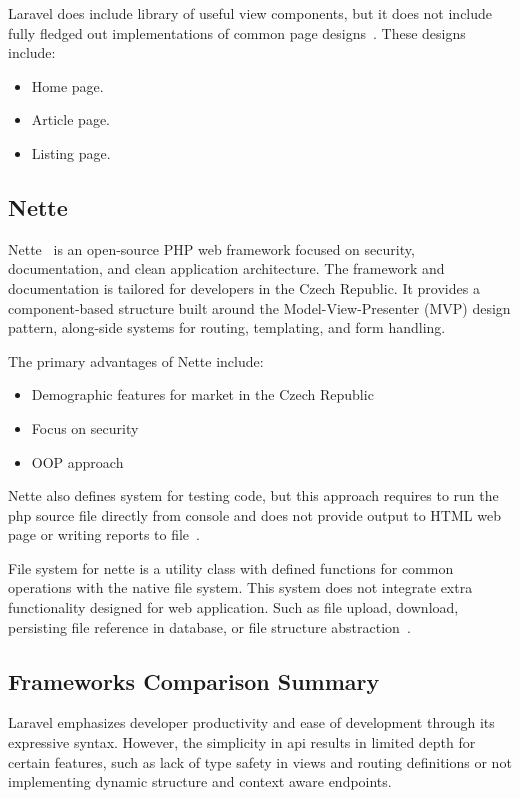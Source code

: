 Laravel does include library of useful view components,
but it does not include fully fledged out implementations of common page designs~\parencite{laravel_components}.
These designs include:

\begin{itemize}
    \item Home page.
    \item Article page.
    \item Listing page.
\end{itemize}

\subsection{Nette}\label{subsec:nette}
Nette~\parencite{nette} is an open-source PHP web framework focused on security, documentation, and clean application architecture.
The framework and documentation is tailored for developers in the Czech Republic.
It provides a component-based structure built around the Model-View-Presenter (MVP) design pattern,
along-side systems for routing, templating, and form handling.

The primary advantages of Nette include:

\begin{itemize}
    \item Demographic features for market in the Czech Republic
    \item Focus on security
    \item OOP approach
\end{itemize}

Nette also defines system for testing code, but this approach requires to run the php source file directly from console
and does not provide output to HTML web page or writing reports to file~\parencite{nette_testing}.

File system for nette is a utility class with defined functions for common operations with the native file system.
This system does not integrate extra functionality designed for web application.
Such as file upload, download, persisting file reference in database, or file structure abstraction~\parencite{nette_filesystem}.

\subsection{Frameworks Comparison Summary}\label{subsec:frameworks-comparison-summary}
Laravel emphasizes developer productivity and ease of development through its expressive syntax.
However, the simplicity in api results in limited depth for certain features,
such as lack of type safety in views and routing definitions or not implementing dynamic structure and context aware endpoints.

